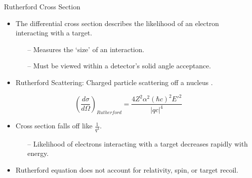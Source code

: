 \documentclass[10pt]{beamer}
\begin{document}
\begin{frame}[fragile]{Rutherford Cross Section}
      \begin{itemize}
        \item The differential cross section describes the \alert{likelihood of an electron interacting with a target}.
           \begin{itemize}
           	  \item[--] Measures the `size' of an interaction.
           	  \item[--] Must be viewed within a detector's solid angle acceptance.
           \end{itemize}
        \item \alert{Rutherford Scattering}: Charged particle scattering off a nucleus \cite{Book:Povh}.
      \end{itemize}

	\pause
	\begin{equation} \label{eq:rutherford_2}
		\left(\frac{d\sigma}{d\Omega}\right)_{Rutherford} = \frac{4Z^2\alpha^2\left(\hbar c\right)^2E'^2}{|qc|^4}
	\end{equation}
	
	\begin{itemize}
		\item<3-> Cross section falls off like \alert{$\frac{1}{q^4}$}.
		   \begin{itemize}
           	  \item[--] Likelihood of electrons interacting with a target decreases rapidly with energy.
           \end{itemize}
		\item<4-> Rutherford equation does not account for \alert{relativity}, \alert{spin}, or target \alert{recoil}.
	\end{itemize}
\end{frame}
\end{document}
